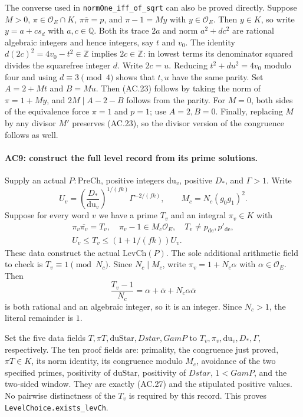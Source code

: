 \documentclass[11pt,a4paper]{article}
\numberwithin{equation}{section}
\theoremstyle{remark}\newtheorem{remark}[theorem]{Remark}
\begin{document}
The converse used in \texttt{normOne\_\allowbreak iff\_\allowbreak of\_\allowbreak sqrt} can also be
proved directly. Suppose $M>0$, $\pi\in\mathcal O_E\cap K$,
$\pi\overline\pi=p$, and $\pi-1=M y$ with $y\in\mathcal O_E$.
Then $y\in K$, so write $y=a+c s_d$ with $a,c\in\mathbb Q$.
Both its trace $2a$ and norm $a^2+dc^2$ are rational algebraic
integers and hence integers, say $t$ and $v_0$.
The identity $d(2c)^2=4v_0-t^2\in\mathbb Z$ implies
$2c\in\mathbb Z$: in lowest terms its denominator squared divides
the squarefree integer $d$. Write $2c=u$.
Reducing $t^2+du^2=4v_0$ modulo four and using $d\equiv3\pmod4$
shows that $t,u$ have the same parity. Set
$A=2+Mt$ and $B=Mu$. Then (AC.23) follows by taking the norm of
$\pi=1+My$, and $2M\mid A-2-B$ follows from the parity.
For $M=0$, both sides of the equivalence force $\pi=1$ and $p=1$;
use $A=2,B=0$. Finally, replacing $M$ by any divisor $M'$ preserves
(AC.23), so the divisor version of the congruence follows as well.

\paragraph{AC9: construct the full level record from its prime solutions.}
Supply an actual $P:\mathrm{PreCh}$, positive integers $\mathrm{du}_v$,
positive $D_*$, and $\Gamma>1$. Write
\[
 U_v=\left(\frac{D_*}{\mathrm{du}_v}\right)^{1/(fk)}
                         \Gamma^{-2/(fk)},\qquad
 M_c=N_c(g_0g_1)^2.                                         \tag{AC.26}
\]
Suppose for every word $v$ we have a prime $T_v$ and an integral
$\pi_v\in K$ with
\[
 \begin{gathered}
 \pi_v\overline{\pi_v}=T_v,\quad
 \pi_v-1\in M_c\mathcal O_E,\quad
 T_v\ne p_{\mathrm{de}},p'_{\mathrm{de}},\\
       U_v\leq T_v\leq(1+1/(fk))U_v.
 \end{gathered}                                              \tag{AC.27}
\]
These data construct the actual $\mathrm{LevCh}(P)$.
The sole additional arithmetic field to check is
$T_v\equiv1\pmod {N_c}$.
Since $N_c\mid M_c$, write $\pi_v=1+N_c\alpha$ with
$\alpha\in\mathcal O_E$. Then
\[
 \frac{T_v-1}{N_c}
       =\alpha+\overline\alpha+N_c\alpha\overline\alpha
\]
is both rational and an algebraic integer, so it is an integer.
Since $N_c>1$, the literal remainder is $1$.

Set the five data fields $T,\pi T,\mathrm{duStar},Dstar,GamP$
to $T_v,\pi_v,\mathrm{du}_v,D_*,\Gamma$, respectively.
The ten proof fields are: primality, the congruence just proved,
$\pi T\in K$, its norm identity, its congruence modulo $M_c$,
avoidance of the two specified primes, positivity of $\mathrm{duStar}$,
positivity of $Dstar$, $1<GamP$, and the two-sided window.
They are exactly (AC.27) and the stipulated positive values.
No pairwise distinctness of the $T_v$ is required by this record.
This proves \texttt{LevelChoice.exists\_\allowbreak levCh}.
\end{document}
